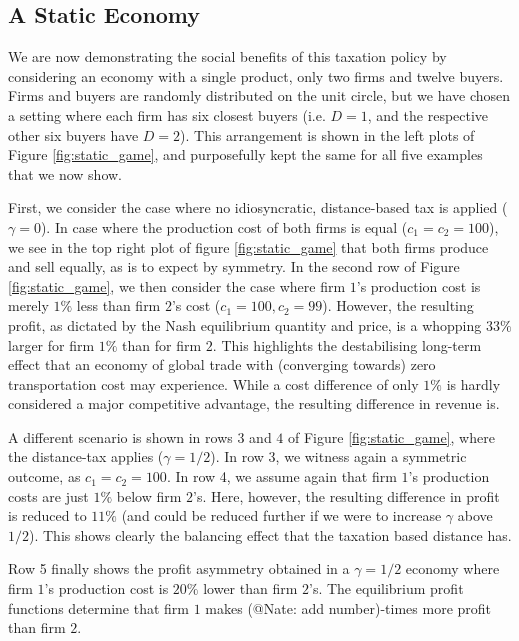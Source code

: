 \documentclass[final,3p,times,authoryear,12pt]{elsarticle}
\newcommand{\red}[1]{\textcolor{WildStrawberry}{#1}} %
\begin{document}
\subsection{A Static Economy} 
\label{sec:static_economy}

We are now demonstrating the social benefits of this taxation policy by considering an economy with a single product, only two firms and twelve buyers. 
Firms and buyers are randomly distributed on the unit circle, but we have chosen a setting where each firm has six closest buyers (i.e. $D=1$, and the respective other six buyers have $D=2$). 
This arrangement is shown in the left plots of Figure \ref{fig:static_game}, and purposefully kept the same for all five examples that we now show. 

First, we consider the case where no idiosyncratic, distance-based tax is applied ($\gamma=0$). 
In case where the production cost of both firms is equal ($c_1=c_2 = 100$), we see in the top right plot of figure \ref{fig:static_game} that both firms produce and sell equally, as is to expect by symmetry. 
In the second row of Figure \ref{fig:static_game}, we then consider the case where firm $1$'s production cost is merely $1\%$ less than firm $2$'s cost ($c_1=100, c_2=99$). 
However, the resulting profit, as dictated by the Nash equilibrium quantity and price, is a whopping $33\%$ larger for firm $1\%$ than for firm $2$. 
This highlights the destabilising long-term effect that an economy of global trade with (converging towards) zero transportation cost may experience. 
While a cost difference of only $1\%$ is hardly considered a major competitive advantage, the resulting difference in revenue is. 

A different scenario is shown in rows $3$ and $4$ of Figure \ref{fig:static_game}, where the distance-tax applies ($\gamma = 1/2$).
In row 3, we witness again a symmetric outcome, as $c_1 = c_2 = 100$. 
In row 4, we assume again that firm $1$'s production costs are just $1\%$ below firm $2$'s. 
Here, however, the resulting difference in profit is reduced to $11\%$ (and could be reduced further if we were to increase $\gamma$  above $1/2$). 
This shows clearly the balancing effect that the taxation based distance has. 

Row 5 finally shows the profit asymmetry obtained in a $\gamma=1/2$ economy where firm $1$'s production cost is $20\%$ lower than firm $2$'s. 
The equilibrium profit functions determine that firm $1$ makes \red{(@Nate: add number)}-times more profit than firm $2$. 
\end{document}
